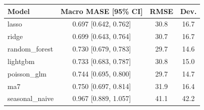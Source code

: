 \begin{tabular}{lccc}
\toprule
Model & Macro MASE [95\% CI] & RMSE & Dev. \\
\midrule
lasso & 0.697 [0.642, 0.762] & 30.8 & 16.7 \\
ridge & 0.699 [0.643, 0.764] & 30.7 & 16.7 \\
random\_forest & 0.730 [0.679, 0.783] & 29.7 & 14.6 \\
lightgbm & 0.733 [0.683, 0.787] & 30.8 & 15.0 \\
poisson\_glm & 0.744 [0.695, 0.800] & 29.7 & 14.7 \\
ma7 & 0.750 [0.697, 0.814] & 31.9 & 16.4 \\
seasonal\_naive & 0.967 [0.889, 1.057] & 41.1 & 42.2 \\
\bottomrule
\end{tabular}
